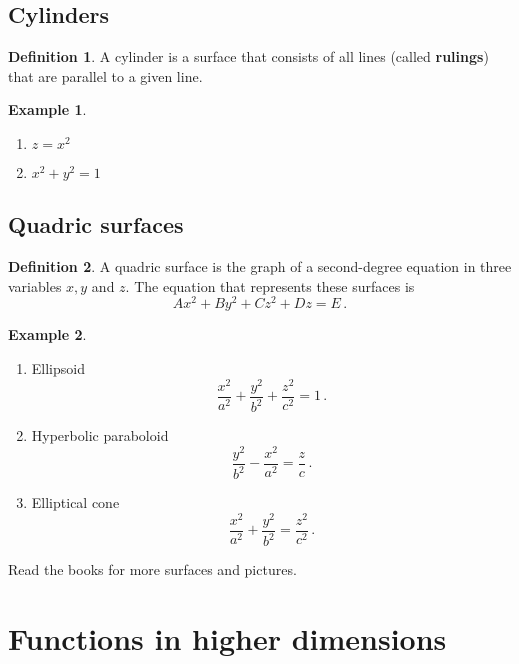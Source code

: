 \documentclass[
]{book}
\providecommand{\tightlist}{%
  \setlength{\itemsep}{0pt}\setlength{\parskip}{0pt}}
\theoremstyle{definition}
\newtheorem{definition}{Definition}[chapter]
\theoremstyle{definition}
\newtheorem{example}{Example}[chapter]
\theoremstyle{definition}
\theoremstyle{definition}
\theoremstyle{remark}
\begin{document}
\section{Cylinders}\label{cylinders}

\begin{definition}
A cylinder is a surface that consists of all lines (called \textbf{rulings}) that
are parallel to a given line.
\end{definition}

\begin{example}
\leavevmode

\begin{enumerate}
\def\labelenumi{\arabic{enumi}.}
\tightlist
\item
  \(z = x^2\)
\item
  \(x^2 + y^2 = 1\)
\end{enumerate}

\end{example}

\section{Quadric surfaces}\label{quadric-surfaces}

\begin{definition}
A quadric surface is the graph of a second-degree equation in three variables
\(x,y\) and \(z\).
The equation that represents these surfaces is
\[Ax^2 + By^2 + Cz^2 + Dz = E\,.\]
\end{definition}

\begin{example}
\leavevmode

\begin{enumerate}
\def\labelenumi{\arabic{enumi}.}
\item
  Ellipsoid
  \[\frac{x^2}{a^2} + \frac{y^2}{b^2} + \frac{z^2}{c^2} = 1\,. \]
\item
  Hyperbolic paraboloid
  \[\frac{y^2}{b^2} - \frac{x^2}{a^2} = \frac{z}{c} \,.\]
\item
  Elliptical cone
  \[\frac{x^2}{a^2} + \frac{y^2}{b^2} = \frac{z^2}{c^2} \,.\]
\end{enumerate}

Read the books for more surfaces and pictures.

\end{example}

\newpage

\chapter{Functions in higher dimensions}\label{functions-in-higher-dimensions}
\end{document}
